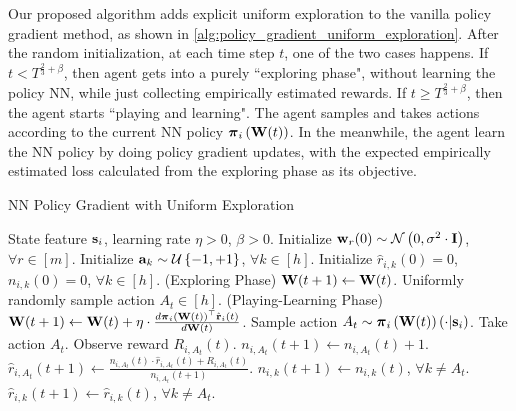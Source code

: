 Our proposed algorithm adds explicit uniform exploration to the vanilla policy gradient method, as shown in \cref{alg:policy_gradient_uniform_exploration}. After the random initialization, at each time step $t$, one of the two cases happens. If $t < T^{\frac{2}{3} + \beta}$, then agent gets into a purely ``exploring phase", without learning the policy NN, while just collecting empirically estimated rewards. If $t \ge T^{\frac{2}{3} + \beta}$, then the agent starts ``playing and learning". The agent samples and takes actions according to the current NN policy ${\boldsymbol{\pi}}_{i}\left({\mathbf{W}}(t)\right)$. In the meanwhile, the agent learn the NN policy by doing policy gradient updates, with the expected empirically estimated loss calculated from the exploring phase as its objective.

\begin{algorithm}[t]
   \caption{NN Policy Gradient with Uniform Exploration}
\label{alg:policy_gradient_uniform_exploration}
\begin{algorithmic}
    State feature ${\mathbf{s}}_i$, learning rate $\eta > 0$, $\beta > 0$.
   \STATE Initialize ${\mathbf{w}}_r(0) \sim {\mathcal{N}}\left( 0, \sigma^2 \cdot {\mathbf{I}} \right)$, $\forall r \in [m]$. \STATE Initialize ${\mathbf{a}}_k \sim {\mathcal{U}}\left\{-1, +1\right\}$, $\forall k \in [h]$.
   \STATE Initialize $\hat{r}_{i,k}\left(0\right) = 0$, $n_{i,k}\left(0\right) = 0$, $\forall k \in [h]$.
   \STATE (Exploring Phase)
   \STATE ${\mathbf{W}}(t+1) \leftarrow {\mathbf{W}}(t)$.
   \STATE Uniformly randomly sample action $A_{t} \in [h]$.
   \ELSE
   \STATE (Playing-Learning Phase)
   \STATE ${\mathbf{W}}(t+1) \leftarrow {\mathbf{W}}(t) + \eta \cdot \frac{d {\boldsymbol{\pi}}_{i}\left({\mathbf{W}}(t)\right)^\top \hat{{\mathbf{r}}}_i \left(t\right)}{d {\mathbf{W}}(t)}$.
   \STATE Sample action $A_{t} \sim {\boldsymbol{\pi}}_{i}\left({\mathbf{W}}(t)\right)\left(\cdot \middle| {\mathbf{s}}_i \right)$.
   \ENDIF
   \STATE Take action $A_{t}$. Observe reward $R_{i, A_{t}}\left(t\right)$.
   \STATE $n_{i, A_{t}}\left(t+1\right) \gets n_{i, A_{t}}\left(t\right) + 1$.
   \STATE $\hat{r}_{i,A_{t}}\left(t+1\right) \gets \frac{n_{i, A_{t}}\left(t\right) \cdot \hat{r}_{i,A_{t}}\left(t\right) + R_{i, A_{t}}\left(t\right) }{n_{i, A_{t}}\left(t+1\right)}$.
   \STATE $n_{i, k}\left(t+1\right) \gets n_{i, k}\left(t\right)$, $\forall k \not= A_t$.
   \STATE $\hat{r}_{i,k}\left(t+1\right) \gets \hat{r}_{i,k}\left(t\right)$, $\forall k \not= A_t$.
   \ENDFOR
\end{algorithmic}
\end{algorithm}

